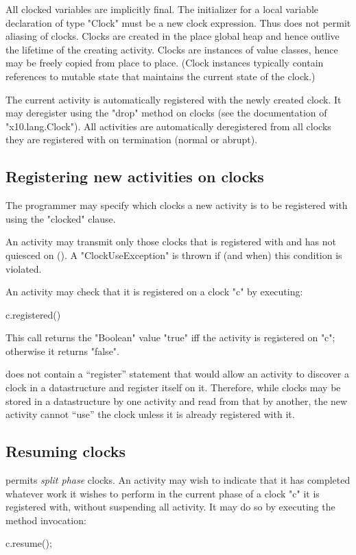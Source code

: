 All clocked variables are implicitly final. The initializer for a
local variable declaration of type \xcd"Clock" must be a new clock
expression. Thus \Xten{} does not permit aliasing of clocks.
Clocks are created in the place global heap and hence outlive the
lifetime of the creating activity.  Clocks are instances of value
classes, hence may be freely copied from place to
place. (Clock instances typically contain references to mutable state
that maintains the current state of the clock.)

The current activity is automatically registered with the newly
created clock.  It may deregister using the \xcd"drop" method on
clocks (see the documentation of \xcd"x10.lang.Clock"). All activities
are automatically deregistered from all clocks they are registered
with on termination (normal or abrupt).

\subsection{Registering new activities on clocks}
\label{sec:clock:register}

The programmer may specify which clocks a new activity is to be
registered with using the \xcd"clocked" clause.

An activity may transmit only those clocks that is registered with and
has not quiesced on (). 
A \xcd"ClockUseException" is
thrown if (and when) this condition is violated.

An activity may check that it is registered on a clock \xcd"c" by
executing:
\begin{xten}
c.registered()
\end{xten}
\noindent This call returns the \xcd"Boolean" value \xcd"true" iff the
activity is registered on \xcd"c"; otherwise it returns \xcd"false".

\begin{note}
\Xten{} does not contain a ``register'' statement that would allow an
activity to discover a clock in a datastructure and register itself on
it. Therefore, while clocks may be stored in a datastructure by one
activity and read from that by another, the new activity cannot
``use'' the clock unless it is already registered with it.
\end{note}


\subsection{Resuming clocks}\label{resume}\label{sec:clock:resume}
\Xten{} permits {\em split phase} clocks. An activity may wish
to indicate that it has completed whatever work it wishes to perform
in the current phase of a  clock \xcd"c" it is registered with, without
suspending all activity. It may do so  by executing the method
invocation:
\begin{xten}
c.resume();
\end{xten}

